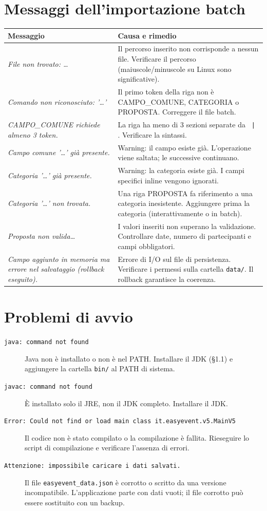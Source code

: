 \documentclass[12pt,a4paper,oneside]{report}
\newcommand{\file}[1]{\texttt{\small#1}}
\begin{document}
\section{Messaggi dell'importazione batch}

\begin{longtable}{L{5.5cm}L{7.5cm}}
\toprule
\textbf{Messaggio} & \textbf{Causa e rimedio} \\
\midrule
\endhead
\textit{File non trovato: …} & Il percorso inserito non corrisponde a nessun file. Verificare il percorso (maiuscole/minuscole su Linux sono significative). \\[4pt]
\textit{Comando non riconosciuto: '…'} & Il primo token della riga non è CAMPO\_COMUNE, CATEGORIA o PROPOSTA. Correggere il file batch. \\[4pt]
\textit{CAMPO\_COMUNE richiede almeno 3 token.} & La riga ha meno di 3 sezioni separate da \texttt{ | }. Verificare la sintassi. \\[4pt]
\textit{Campo comune '…' già presente.} & Warning: il campo esiste già. L'operazione viene saltata; le successive continuano. \\[4pt]
\textit{Categoria '…' già presente.} & Warning: la categoria esiste già. I campi specifici inline vengono ignorati. \\[4pt]
\textit{Categoria '…' non trovata.} & Una riga PROPOSTA fa riferimento a una categoria inesistente. Aggiungere prima la categoria (interattivamente o in batch). \\[4pt]
\textit{Proposta non valida…} & I valori inseriti non superano la validazione. Controllare date, numero di partecipanti e campi obbligatori. \\[4pt]
\textit{Campo aggiunto in memoria ma errore nel salvataggio (rollback eseguito).} & Errore di I/O sul file di persistenza. Verificare i permessi sulla cartella \file{data/}. Il rollback garantisce la coerenza. \\[4pt]
\bottomrule
\end{longtable}

\section{Problemi di avvio}

\begin{description}
  \item[\texttt{java: command not found}] Java non è installato o non è nel PATH. Installare il JDK (§1.1) e aggiungere la cartella \file{bin/} al PATH di sistema.
  \item[\texttt{javac: command not found}] È installato solo il JRE, non il JDK completo. Installare il JDK.
  \item[\texttt{Error: Could not find or load main class it.easyevent.v5.MainV5}] Il codice non è stato compilato o la compilazione è fallita. Rieseguire lo script di compilazione e verificare l'assenza di errori.
  \item[\texttt{Attenzione: impossibile caricare i dati salvati.}] Il file \file{easyevent\_data.json} è corrotto o scritto da una versione incompatibile. L'applicazione parte con dati vuoti; il file corrotto può essere sostituito con un backup.
\end{description}
\end{document}
